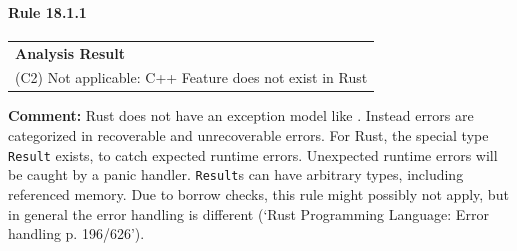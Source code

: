 \paragraph{Rule 18.1.1}
\begin{longtable}{p{13cm}}
\textbf{Analysis Result} \\
(C2) Not applicable: C++ Feature does not exist in Rust \\
\end{longtable}
\textbf{Comment:} Rust does not have an exception model like \Cpp. Instead errors are categorized in recoverable and unrecoverable errors. For Rust, the special type \texttt{Result} exists, to catch expected runtime errors. Unexpected runtime errors will be caught by a panic handler. \texttt{Result}s can have arbitrary types, including referenced memory. Due to borrow checks, this rule might possibly not apply, but in general the error handling is different (`Rust Programming Language: Error handling p. 196/626'). \\
